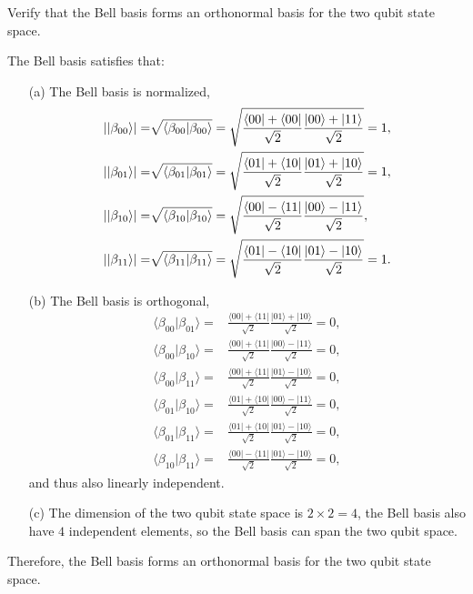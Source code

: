 \documentclass[en]{sol-man}
\begin{document}
\begin{exe}
    Verify that the Bell basis forms an orthonormal basis for the two qubit state space.
\end{exe}
\begin{pf}
    The Bell basis satisfies that:
    \begin{itemize}
        \item[(a)] The Bell basis is normalized,
        \begin{align}
            \left\lvert\lvert\beta_{00}\rangle\right\rvert=&\sqrt{\langle\beta_{00}\vert\beta_{00}\rangle}=\sqrt{\frac{\langle 00\rvert+\langle 00\rvert}{\sqrt{2}}\frac{\lvert 00\rangle+\lvert 11\rangle}{\sqrt{2}}}=1,\\
            \left\lvert\lvert\beta_{01}\rangle\right\rvert=&\sqrt{\langle\beta_{01}\vert\beta_{01}\rangle}=\sqrt{\frac{\langle 01\rvert+\langle 10\rvert}{\sqrt{2}}\frac{\lvert 01\rangle+\lvert 10\rangle}{\sqrt{2}}}=1,\\
            \left\lvert\lvert\beta_{10}\rangle\right\rvert=&\sqrt{\langle\beta_{10}\vert\beta_{10}\rangle}=\sqrt{\frac{\langle 00\rvert-\langle 11\rvert}{\sqrt{2}}\frac{\lvert 00\rangle-\lvert 11\rangle}{\sqrt{2}}},\\
            \left\lvert\lvert\beta_{11}\rangle\right\rvert=&\sqrt{\langle\beta_{11}\vert\beta_{11}\rangle}=\sqrt{\frac{\langle 01\rvert-\langle 10\rvert}{\sqrt{2}}\frac{\lvert 01\rangle-\lvert 10\rangle}{\sqrt{2}}}=1.
        \end{align}
        \item[(b)] The Bell basis is orthogonal,
        \begin{align}
            \langle\beta_{00}\vert\beta_{01}\rangle=&\frac{\langle 00\rvert+\langle 11\rvert}{\sqrt{2}}\frac{\lvert 01\rangle+\lvert 10\rangle}{\sqrt{2}}=0,\\
            \langle\beta_{00}\vert\beta_{10}\rangle=&\frac{\langle 00\rvert+\langle 11\rvert}{\sqrt{2}}\frac{\lvert 00\rangle-\lvert 11\rangle}{\sqrt{2}}=0,\\
            \langle\beta_{00}\vert\beta_{11}\rangle=&\frac{\langle 00\rvert+\langle 11\rvert}{\sqrt{2}}\frac{\lvert 01\rangle-\lvert 10\rangle}{\sqrt{2}}=0,\\
            \langle\beta_{01}\vert\beta_{10}\rangle=&\frac{\langle 01\rvert+\langle 10\rvert}{\sqrt{2}}\frac{\lvert 00\rangle-\lvert 11\rangle}{\sqrt{2}}=0,\\
            \langle\beta_{01}\vert\beta_{11}\rangle=&\frac{\langle 01\rvert+\langle 10\rvert}{\sqrt{2}}\frac{\lvert 01\rangle-\lvert 10\rangle}{\sqrt{2}}=0,\\
            \langle\beta_{10}\vert\beta_{11}\rangle=&\frac{\langle 00\rvert-\langle 11\rvert}{\sqrt{2}}\frac{\lvert 01\rangle-\lvert 10\rangle}{\sqrt{2}}=0,
        \end{align}
        and thus also linearly independent.
        \item[(c)] The dimension of the two qubit state space is $2\times 2=4$, the Bell basis also have $4$ independent elements, so the Bell basis can span the two qubit space.
    \end{itemize}
    Therefore, the Bell basis forms an orthonormal basis for the two qubit state space.
\end{pf}

\ifx\allfiles\undefined
\end{document}

